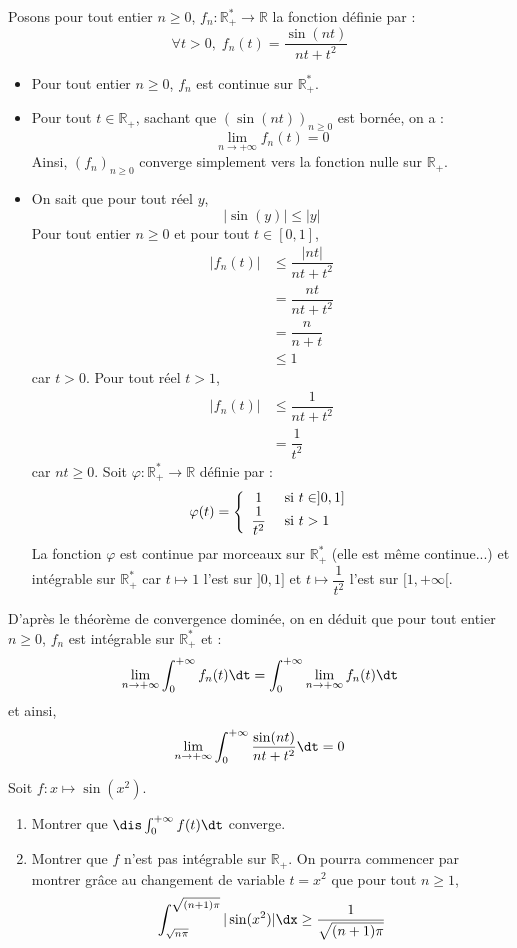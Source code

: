 \documentclass[a4paper,10pt]{report}
\begin{document}
\corr Posons pour tout entier $n \geq 0$, $f_n : \mathbb{R}_+^* \rightarrow \mathbb{R}$ la fonction définie par :
$$ \forall t >0, \; f_n(t) = \frac{\sin(nt)}{nt + t^{2}}$$
\begin{itemize}
\item Pour tout entier $n \geq 0$, $f_n$ est continue sur $\mathbb{R}_+^*$.
\item Pour tout $t \in \mathbb{R}_+$, sachant que $(\sin(nt))_{n \geq 0}$ est bornée, on a :
$$ \lim_{n \rightarrow + \infty} f_n(t) = 0$$
Ainsi, $(f_n)_{n \geq 0}$ converge simplement vers la fonction nulle sur $\mathbb{R}_+$.
\item On sait que pour tout réel $y$,
$$ \vert \sin(y) \vert \leq \vert y \vert$$
Pour tout entier $n \geq 0$ et pour tout $t \in [0,1]$,
\begin{align*}
\vert f_n(t) \vert & \leq \dfrac{\vert nt \vert }{nt+t^2} \\
& = \dfrac{nt}{nt+t^2} \\
& = \dfrac{n}{n+t} \\
& \leq 1
\end{align*}
car $t >0$. Pour tout réel $t>1$,
\begin{align*}
\vert f_n(t) \vert & \leq \dfrac{1}{nt+t^2} \\
& = \dfrac{1}{t^2} 
\end{align*}
car $nt \geq 0$. Soit $\varphi : \mathbb{R}_+^* \rightarrow \mathbb{R}$ définie par :
$$ \varphi(t) = \left\lbrace \begin{array}{cl}
1 & \hbox{ si } t \in ]0,1] \\
\dfrac{1}{t^2} & \hbox{ si } t>1 \\
\end{array}\right.$$
La fonction $\varphi$ est continue par morceaux sur $\mathbb{R}_+^*$ (elle est même continue...) et intégrable sur $\mathbb{R}_+^*$ car $t \mapsto 1$ l'est sur $]0,1]$ et $t \mapsto \dfrac{1}{t^2}$ l'est sur $[1, + \infty[$. 
\end{itemize}
D'après le théorème de convergence dominée, on en déduit que pour tout entier $n \geq 0$, $f_n$ est intégrable sur $\mathbb{R}_+^*$ et :
$$ \lim_{n \rightarrow + \infty} \int_0^{+ \infty} f_n(t) \dt = \int_0^{+ \infty} \lim_{n \rightarrow + \infty}f_n(t) \dt$$
et ainsi,
$$ \lim_{n \to + \infty} \int_{0}^{ + \infty} \frac{\sin(nt)}{nt + t^{2}} \dt = 0$$

\begin{Exa}
Soit $f : x \mapsto \sin(x^2)$.
\begin{enumerate}
\item Montrer que $\dis \int_{0}^{+ \infty}  f(t) \dt$ converge.
\item Montrer que $f$ n'est pas intégrable sur $\mathbb{R}_+$. On pourra commencer par montrer grâce au changement de variable $t=x^2$ que pour tout $n \geq 1$,
$$ \int_{\sqrt{n \pi}}^{\sqrt{(n+1)\pi}} \vert \sin(x^2) \vert \dx \geq \frac{1}{\sqrt{(n+1) \pi}}$$
\end{enumerate}
\end{Exa}
\end{document}
